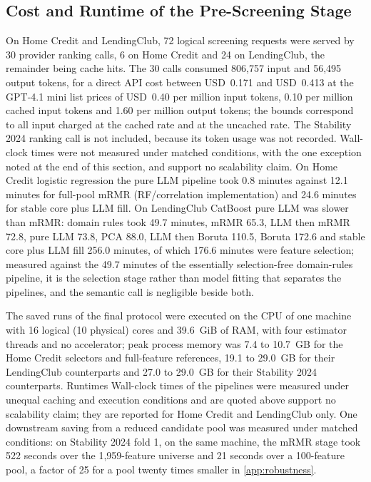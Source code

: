\documentclass[final,5p,twocolumn]{elsarticle}
\providecommand{\DIFaddtex}[1]{{\protect\color{blue} \sf #1}} %
\providecommand{\DIFdeltex}[1]{{\protect\color{red} \scriptsize #1}} %
\providecommand{\DIFaddbegin}{} %
\providecommand{\DIFaddend}{} %
\providecommand{\DIFdelbegin}{} %
\providecommand{\DIFdelend}{} %
\providecommand{\DIFadd}[1]{\texorpdfstring{\DIFaddtex{#1}}{#1}} %
\providecommand{\DIFdel}[1]{\texorpdfstring{\DIFdeltex{#1}}{}} %
\begin{document}
\DIFdelbegin \subsection{\DIFdel{Cost and Runtime of the Pre-Screening Stage}}
\addtocounter{subsection}{-1}%

\DIFdelend On Home Credit and LendingClub, 72 logical screening requests were served by 30 provider ranking calls, 6 on Home Credit and 24 on LendingClub, the remainder being cache hits. The 30 calls consumed 806,757 input and 56,495 output tokens, for a direct API cost between USD~0.171 and USD~0.413 at the GPT-4.1 mini list prices of USD~0.40 per million input tokens, 0.10 per million cached input tokens and 1.60 per million output tokens; the bounds correspond to all input charged at the cached rate and at the uncached rate. The Stability 2024 ranking call is not included, because its token usage was not recorded.
\DIFdelbegin \DIFdel{Wall-clock times were not measured under matched conditions, with the one exception noted at the end of this section, and support no scalability claim. On Home Credit logistic regression the pure LLM pipeline took 0.8 minutes against 12.1 minutes for full-pool mRMR (RF/correlation implementation) and 24.6 minutes for stable core plus LLM fill. On LendingClub CatBoost pure LLM was slower than mRMR: domain rules took 49.7 minutes, mRMR 65.3, LLM then mRMR 72.8, pure LLM 73.8, PCA 88.0, LLM then Boruta 110.5, Boruta 172.6 and stable core plus LLM fill 256.0 minutes, of which 176.6 minutes were feature selection; measured against the 49.7 minutes of the essentially selection-free domain-rules pipeline, it is the selection stage rather than model fitting that separates the pipelines, and the semantic call is negligible beside both. }\DIFdelend \DIFaddbegin 

\DIFaddend The saved runs of the final protocol were executed on the CPU of one machine with 16 logical (10 physical) cores and 39.6~GiB of RAM, with four estimator threads and no accelerator; peak process memory was 7.4 to 10.7~GB for the Home Credit selectors and full-feature references, 19.1 to 29.0~GB for their LendingClub counterparts and 27.0 to 29.0~GB for their Stability 2024 counterparts. \DIFdelbegin \DIFdel{Runtimes }\DIFdelend \DIFaddbegin \DIFadd{Wall-clock times of the pipelines }\DIFaddend were measured under unequal caching and execution conditions and \DIFdelbegin \DIFdel{are quoted above }\DIFdelend \DIFaddbegin \DIFadd{support no scalability claim; they are reported }\DIFaddend for Home Credit and LendingClub \DIFdelbegin \DIFdel{only. One downstream saving from a reduced candidate pool was measured under matched conditions: on Stability 2024 fold 1, on the same machine, the mRMR stage took 522 seconds over the 1,959-feature universe and 21 seconds over a 100-feature pool, a factor of 25 for a pool twenty times smaller}\DIFdelend \DIFaddbegin \DIFadd{in \ref{app:robustness}}\DIFaddend .
\end{document}
